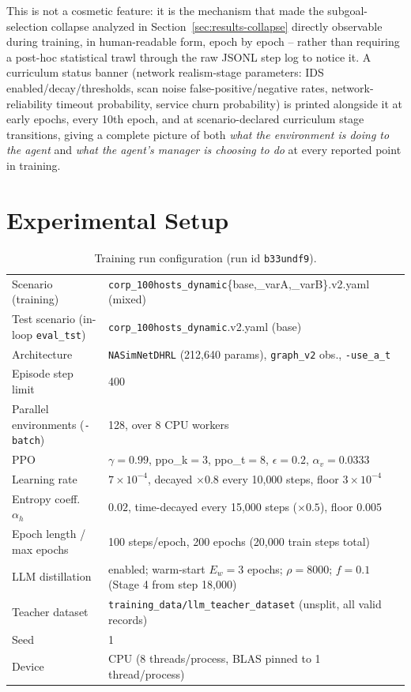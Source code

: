 \documentclass[11pt]{article}
\newcommand{\code}[1]{\texttt{#1}}
\begin{document}
This is not a cosmetic feature: it is the mechanism that made the subgoal-selection
collapse analyzed in Section~\ref{sec:results-collapse} directly observable during
training, in human-readable form, epoch by epoch -- rather than requiring a
post-hoc statistical trawl through the raw JSONL step log to notice it. A curriculum
status banner (network realism-stage parameters: IDS enabled/decay/thresholds, scan
noise false-positive/negative rates, network-reliability timeout probability, service
churn probability) is printed alongside it at early epochs, every 10th epoch, and at
scenario-declared curriculum stage transitions, giving a complete picture of both
\emph{what the environment is doing to the agent} and \emph{what the agent's manager
is choosing to do} at every reported point in training.

\section{Experimental Setup}
\label{sec:setup}

\begin{table}[H]
\centering
\caption{Training run configuration (run id \texttt{b33undf9}).}
\label{tab:hparams}
\small
\begin{tabular}{@{}l p{9.7cm}@{}}
\toprule
Scenario (training) & \texttt{corp\_100hosts\_dynamic}\{base,\_varA,\_varB\}.v2.yaml (mixed) \\
Test scenario (in-loop \code{eval\_tst}) & \texttt{corp\_100hosts\_dynamic}.v2.yaml (base) \\
Architecture & \code{NASimNetDHRL} (212{,}640 params), \code{graph\_v2} obs., \code{-use\_a\_t} \\
Episode step limit & 400 \\
Parallel environments (\code{-batch}) & 128, over 8 CPU workers \\
PPO & $\gamma{=}0.99$, ppo\_k$=3$, ppo\_t$=8$, $\epsilon{=}0.2$, $\alpha_v{=}0.0333$ \\
Learning rate & $7\times 10^{-4}$, decayed $\times0.8$ every 10{,}000 steps, floor $3\times10^{-4}$ \\
Entropy coeff.\ $\alpha_h$ & $0.02$, time-decayed every 15{,}000 steps ($\times 0.5$), floor $0.005$ \\
Epoch length / max epochs & 100 steps/epoch, 200 epochs (20{,}000 train steps total) \\
LLM distillation & enabled; warm-start $E_w{=}3$ epochs; $\rho{=}8000$; $f{=}0.1$ (Stage 4 from step 18{,}000) \\
Teacher dataset & \code{training\_data/llm\_teacher\_dataset} (unsplit, all valid records) \\
Seed & 1 \\
Device & CPU (8 threads/process, BLAS pinned to 1 thread/process) \\
\bottomrule
\end{tabular}
\end{table}
\end{document}
